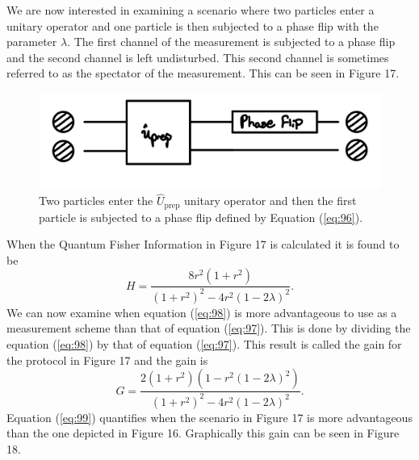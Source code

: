 \documentclass[twocolumn]{article}
\begin{document}
We are now interested in examining a scenario where two particles enter a unitary operator and one particle is then subjected to a phase flip with the parameter $\lambda$. The first channel of the measurement is subjected to a phase flip and the second channel is left undisturbed. This second channel is sometimes referred to as the spectator of the measurement. This can be seen in Figure 17.
\begin{figure}[h]
\begin{center}
\includegraphics[width=0.65\linewidth]{Two-Particle-Phase-Flip-Single-Channel-Lambda-Schematic.jpeg}
\caption{Two particles enter the $\hat{U}_{\text{prep}}$ unitary operator and then the first particle is subjected to a phase flip defined by Equation (\ref{eq:96}).}
\end{center}
\end{figure}
\newline
When the Quantum Fisher Information in Figure 17 is calculated it is found to be
\begin{equation}\label{eq:98}
H=\frac{8r^2(1+r^2)}{(1+r^2)^2-4r^2(1-2\lambda)^2}.
\end{equation}
We can now examine when equation (\ref{eq:98}) is more advantageous to use as a measurement scheme than that of equation (\ref{eq:97}). This is done by dividing the equation (\ref{eq:98}) by that of equation (\ref{eq:97}). This result is called the gain for the protocol in Figure 17 and the gain is
\begin{equation}\label{eq:99}
G=\frac{2(1+r^2)(1-r^2(1-2\lambda)^2)}{(1+r^2)^2-4r^2(1-2\lambda)^2}.
\end{equation}
Equation (\ref{eq:99}) quantifies when the scenario in Figure 17 is more advantageous than the one depicted in Figure 16. Graphically this gain can be seen in Figure 18.
\newpage
\end{document}

